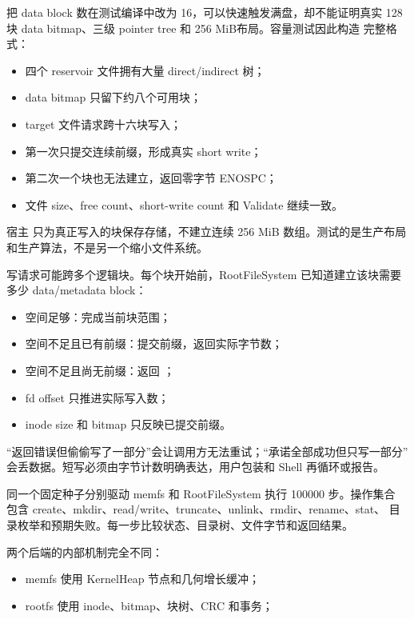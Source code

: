 把 data block 数在测试编译中改为 16，可以快速触发满盘，却不能证明真实
128 块 data bitmap、三级 pointer tree 和 256 MiB布局。容量测试因此构造
完整格式：

\begin{itemize}
  \item 四个 reservoir 文件拥有大量 direct/indirect 树；
  \item data bitmap 只留下约八个可用块；
  \item target 文件请求跨十六块写入；
  \item 第一次只提交连续前缀，形成真实 short write；
  \item 第二次一个块也无法建立，返回零字节 ENOSPC；
  \item 文件 size、free count、short-write count 和 Validate 继续一致。
\end{itemize}

宿主  只为真正写入的块保存存储，不建立连续
256 MiB 数组。测试的是生产布局和生产算法，不是另一个缩小文件系统。

写请求可能跨多个逻辑块。每个块开始前，RootFileSystem 已知道建立该块需要
多少 data/metadata block：

\begin{itemize}
  \item 空间足够：完成当前块范围；
  \item 空间不足且已有前缀：提交前缀，返回实际字节数；
  \item 空间不足且尚无前缀：返回 ；
  \item fd offset 只推进实际写入数；
  \item inode size 和 bitmap 只反映已提交前缀。
\end{itemize}

“返回错误但偷偷写了一部分”会让调用方无法重试；“承诺全部成功但只写一部分”
会丢数据。短写必须由字节计数明确表达，用户包装和 Shell 再循环或报告。

同一个固定种子分别驱动 memfs 和 RootFileSystem 执行 100000 步。操作集合
包含 create、mkdir、read/write、truncate、unlink、rmdir、rename、stat、
目录枚举和预期失败。每一步比较状态、目录树、文件字节和返回结果。

两个后端的内部机制完全不同：

\begin{itemize}
  \item memfs 使用 KernelHeap 节点和几何增长缓冲；
  \item rootfs 使用 inode、bitmap、块树、CRC 和事务；
\end{itemize}

